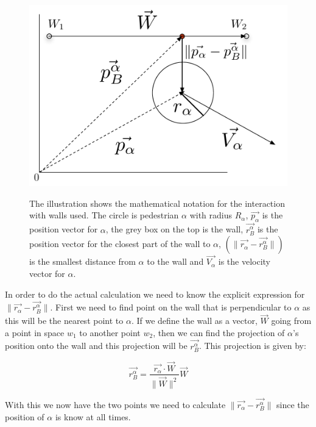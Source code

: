 \begin{figure}[ht]
\centering
{\includegraphics[scale=0.35]{Figures/NotationOfWall.pdf}} 
\caption[Notation of the interaction between an agent and a wall]{The illustration shows the mathematical notation for the interaction with walls used. The circle is pedestrian $\alpha$ with radius $R_{\alpha}$, $\vec{p_{\alpha}}$ is the position vector for $\alpha$, the grey box on the top is the wall, $\vec{r_{B}^{\alpha}}$ is the position vector for the closest part of the wall to $\alpha$, $\left( \| \vec{r_{\alpha}} - \vec{r_{B}^{\alpha}} \| \right)$ is the smallest distance from $\alpha$ to the wall and $\vec{V_{\alpha}}$ is the velocity vector for $\alpha$.}
\label{NotationOfWall}
\end{figure}

In order to do the actual calculation we need to know the explicit expression for 
$ \| \vec{r_{\alpha}} - \vec{r_{B}^{\alpha}} \|$. First we need to find point on the wall 
that is perpendicular to $\alpha$ as this will be the nearest point to $\alpha$. If we define 
the wall as a vector, $\vec{W}$ going from a point in space $w_1$ to another point $w_2$, then 
we can find the projection of $\alpha$'s position onto the wall and this projection will be 
$\vec{r_{B}^{\alpha}}$. This projection is given by:

\begin{equation}\label{wall}
\vec{r_{B}^{\alpha}}=\frac{\vec{r_{\alpha}}\cdot \vec{W}}{\| \vec{W} \|^2}\vec{W}
\end{equation}

With this we now have the two points we need to calculate $\|\vec{r_{\alpha}} - \vec{r_{B}^{\alpha}}\|$ 
since the position of $\alpha$ is know at all times.

